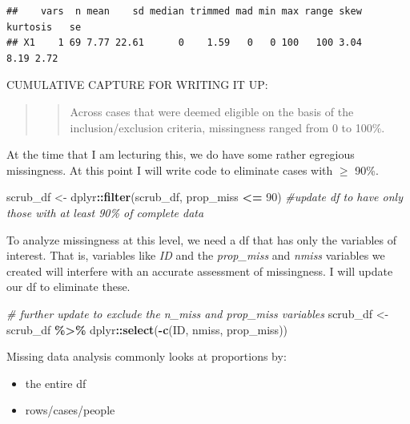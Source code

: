 \documentclass[
  11pt,
]{book}
\newenvironment{Shaded}{\begin{snugshade}}{\end{snugshade}}
\newcommand{\CommentTok}[1]{\textcolor[rgb]{0.37,0.37,0.37}{\textit{#1}}}
\newcommand{\DecValTok}[1]{\textcolor[rgb]{0.06,0.06,0.06}{#1}}
\newcommand{\FunctionTok}[1]{\textcolor[rgb]{0.27,0.27,0.27}{\textbf{#1}}}
\newcommand{\NormalTok}[1]{#1}
\newcommand{\OtherTok}[1]{\textcolor[rgb]{0.37,0.37,0.37}{#1}}
\newcommand{\SpecialCharTok}[1]{\textcolor[rgb]{0.43,0.43,0.43}{\textbf{#1}}}
\providecommand{\tightlist}{%
  \setlength{\itemsep}{0pt}\setlength{\parskip}{0pt}}
\begin{document}
\begin{verbatim}
##    vars  n mean    sd median trimmed mad min max range skew kurtosis   se
## X1    1 69 7.77 22.61      0    1.59   0   0 100   100 3.04     8.19 2.72
\end{verbatim}

CUMULATIVE CAPTURE FOR WRITING IT UP:

\begin{quote}
\begin{quote}
Across cases that were deemed eligible on the basis of the inclusion/exclusion criteria, missingness ranged from 0 to 100\%.
\end{quote}
\end{quote}

At the time that I am lecturing this, we do have some rather egregious missingness. At this point I will write code to eliminate cases with \(\geq\) 90\%.

\begin{Shaded}
\begin{Highlighting}[]
\NormalTok{scrub\_df }\OtherTok{\textless{}{-}}\NormalTok{ dplyr}\SpecialCharTok{::}\FunctionTok{filter}\NormalTok{(scrub\_df, prop\_miss }\SpecialCharTok{\textless{}=} \DecValTok{90}\NormalTok{)  }\CommentTok{\#update df to have only those with at least 90\% of complete data}
\end{Highlighting}
\end{Shaded}

To analyze missingness at this level, we need a df that has only the variables of interest. That is, variables like \emph{ID} and the \emph{prop\_miss} and \emph{nmiss} variables we created will interfere with an accurate assessment of missingness. I will update our df to eliminate these.

\begin{Shaded}
\begin{Highlighting}[]
\CommentTok{\# further update to exclude the n\_miss and prop\_miss variables}
\NormalTok{scrub\_df }\OtherTok{\textless{}{-}}\NormalTok{ scrub\_df }\SpecialCharTok{\%\textgreater{}\%}
\NormalTok{    dplyr}\SpecialCharTok{::}\FunctionTok{select}\NormalTok{(}\SpecialCharTok{{-}}\FunctionTok{c}\NormalTok{(ID, nmiss, prop\_miss))}
\end{Highlighting}
\end{Shaded}

Missing data analysis commonly looks at proportions by:

\begin{itemize}
\tightlist
\item
  the entire df
\item
  rows/cases/people
\end{itemize}
\end{document}
